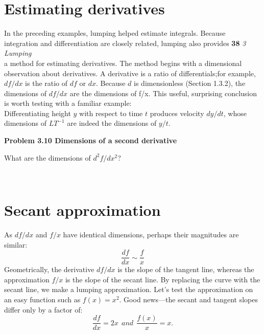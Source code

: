 \documentclass[a4paper, 12pt]{book}
\begin{document}
    \section{Estimating derivatives}
    In the preceding examples, lumping helped estimate integrals. Because
    integration and differentiation are closely related, lumping also provides
    \newpage
    \noindent
    \large\textbf{38} \hfill \textit{3 Lumping} \\

    a method for estimating derivatives. The method begins with a dimensional observation about derivatives. A derivative is a ratio of differentials;for example,$df/dx$ is the ratio of $df$ or $dx$. Because $d$ is dimensionless
    (Section 1.3.2), the dimensions of $df/dx$ are the dimensions of f/x. This useful, surprising conclusion is worth testing with a familiar example:\\
    Differentiating height $y$ with respect to time $t$ produces velocity $dy/dt$, whose dimensions of $LT^{-1}$ are indeed the dimensions of $y/t$.
    \\
    \colorbox{light-gray}{
    \begin{minipage}{\textwidth}
    \textbf{Problem 3.10 Dimensions of a second derivative}

    What are the dimensions of $d^2f/dx^2$?\\
    \end{minipage}}
    \\
    \section{Secant approximation}
    As $df/dx$ and $f/x$ have identical dimensions,
    perhaps their magnitudes are similar:
    \begin{equation} \frac{df}{dx}\sim\frac{f}{x}\end{equation}
    Geometrically, the derivative $df/dx$ is the slope
    of the tangent line, whereas the approximation
    $f/x$ is the slope of the secant line. By replacing
    the curve with the secant line, we make a
    lumping approximation.
    Let’s test the approximation on an easy function such as $f(x)=x^2$. Good
    news—the secant and tangent slopes differ only by a factor of:
    \begin{equation}\frac{df}{dx}=2x~~and~~\frac{f(x)}{x}=x.\end{equation}
\end{document}
